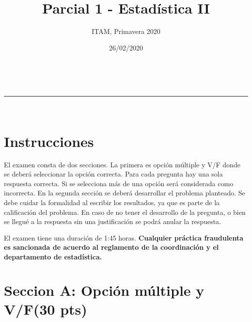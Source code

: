 \documentclass[addpoints]{exam}
\makeatletter
\newcommand{\linia}{\rule{\linewidth}{0.5pt}}
\theoremstyle{mytheor}
\renewcommand{\maketitle}{
    \begin{center}
    \vspace{2ex}
    {\huge \textsc{\@title}}
    \vspace{1ex}
    \\
    \linia\\
    \@author \hfill \@date
    \vspace{4ex}
    \end{center}
  }
\makeatother
\begin{document}
  
  \title{Parcial 1 - Estadística II}
  
  \author{ITAM, Primavera 2020}
  
  \date{26/02/2020}
  
  \maketitle
  
  \section*{Instrucciones}
  
El examen consta de dos secciones. La primera es opción múltiple y V/F donde se deberá seleccionar la opción correcta. Para cada pregunta hay una sola respuesta correcta. Si se selecciona más de una opción será considerada como incorrecta. En la segunda sección se deberá desarrollar el problema planteado. Se debe cuidar la formalidad al escribir los resultados, ya que es parte de la calificación del problema. En caso de no tener el desarrollo de la pregunta, o bien se llegué a la respuesta sin una justificación se podrá anular la respuesta. 
  
  \vspace{10pt}
  
El examen tiene una duración de 1:45 horas. \textbf{Cualquier práctica fraudulenta es sancionada de acuerdo al reglamento de la coordinación y el departamento de estadística.} 
  
  \section*{Seccion A: Opción múltiple y V/F(30 pts)}
  
\end{document}
